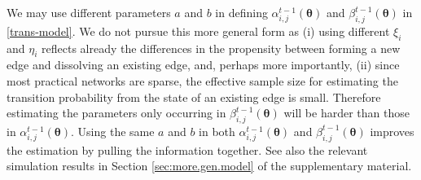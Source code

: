 \documentclass[12pt]{article}
\newcommand{\btheta}{\boldsymbol \theta}
\newcommand{\bX}{{\bf X}}
\newcommand{\0}{{\bf 0}}
\begin{document}
We may use different parameters $a$ and $b$ in defining $\alpha_{i,j}^{t-1}(\btheta)$ and $\beta_{i,j}^{t-1}(\btheta)$ in \eqref{trans-model}. We do not pursue this more general form as (i) using different $\xi_i$ and $\eta_i$  reflects already the differences in the propensity between forming a new edge and dissolving an existing edge, and, perhaps more importantly, (ii) since most practical networks are sparse, the effective sample size for estimating the transition probability from the state of an existing edge is small. Therefore estimating the parameters only occurring in $\beta_{i,j}^{t-1}(\btheta)$ will be harder than those in $\alpha_{i,j}^{t-1}(\btheta)$. Using the same $a$ and $b$ in both $\alpha_{i,j}^{t-1}(\btheta)$ and $\beta_{i,j}^{t-1}(\btheta)$ improves the estimation by pulling the information together. See also the relevant simulation results in Section \ref{sec:more.gen.model} of the supplementary material.


\end{document}
